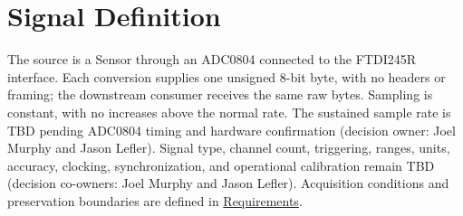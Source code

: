 \section{Signal Definition}
\label{Section:ProjectSignals}
The source is a Sensor through an ADC0804 connected to the FTDI245R
interface. Each conversion supplies one unsigned 8-bit byte, with no headers
or framing; the downstream consumer receives the same raw bytes. Sampling
is constant, with no increases above the normal rate. The sustained sample
rate is TBD pending ADC0804 timing and hardware confirmation (decision owner:
Joel Murphy and Jason Lefler). Signal type, channel count, triggering, ranges, units,
accuracy, clocking, synchronization, and operational calibration remain
TBD (decision co-owners: Joel Murphy and Jason Lefler). Acquisition conditions and preservation
boundaries are defined in \hyperref[Section:ProjectAcquisitionConditions]{Requirements}.

